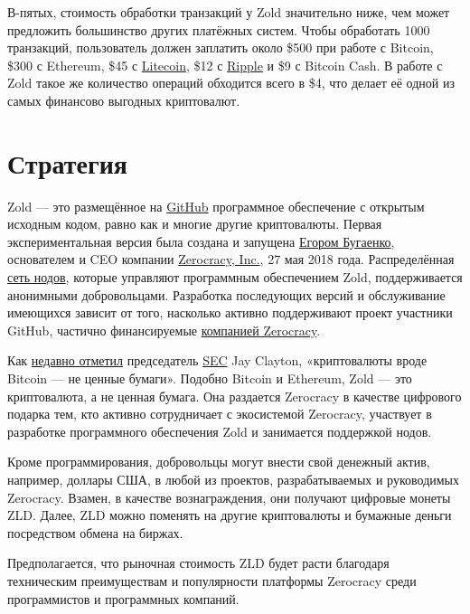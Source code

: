 \documentclass{main}
\begin{document}
В-пятых, стоимость обработки транзакций у Zold значительно ниже, чем может
предложить большинство других платёжных систем. Чтобы обработать 1000
транзакций, пользователь должен заплатить около \$500 при работе с Bitcoin, \$300
с Ethereum, \$45 с \href{https://litecoin.org/}{Litecoin}, \$12 с \href{https://ripple.com/}{Ripple}
и \$9 с Bitcoin Cash. В работе с Zold
такое же количество операций обходится всего в \$4, что делает её одной из самых
финансово выгодных криптовалют.

\pagebreak

\section*{Стратегия}

Zold --- это размещённое на \href{https://github.com/zold-io}{GitHub} программное обеспечение с открытым исходным
кодом, равно как и многие другие криптовалюты. Первая экспериментальная версия была
создана и запущена \href{https://www.yegor256.com}{Егором Бугаенко}, основателем
и CEO компании \href{https://www.zerocracy.com}{Zerocracy, Inc.}, 27 мая 2018 года.
Распределённая \href{http://www.zold.io/map.html}{сеть нодов}, которые управляют
программным обеспечением Zold, поддерживается анонимными
добровольцами. Разработка последующих версий и обслуживание имеющихся зависит от
того, насколько активно поддерживают проект участники GitHub, частично
финансируемые \href{https://www.zerocracy.com}{компанией Zerocracy}.

Как \href{https://www.cnbc.com/video/2018/06/06/sec-chairman-cryptocurrencies-like-bitcoin--not-securities.html}{недавно отметил}
председатель \href{https://www.sec.gov/}{SEC} Jay Clayton, «криптовалюты вроде Bitcoin ---
не ценные бумаги». Подобно Bitcoin и Ethereum, Zold --- это криптовалюта, а не
ценная бумага. Она раздается Zerocracy в качестве цифрового подарка тем, кто
активно сотрудничает с экосистемой Zerocracy, участвует в разработке программного обеспечения
Zold и занимается поддержкой нодов.

Кроме программирования, добровольцы могут внести свой денежный актив, например,
доллары США, в любой из проектов, разрабатываемых и руководимых Zerocracy.
Взамен, в качестве вознаграждения, они получают цифровые монеты ZLD. Далее, ZLD
можно поменять на другие криптовалюты и бумажные деньги посредством обмена на биржах.

Предполагается, что рыночная стоимость ZLD будет расти благодаря техническим
преимуществам и популярности платформы Zerocracy среди программистов и
программных компаний.
\end{document}
